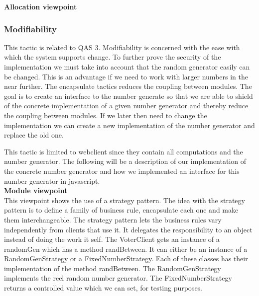 \noindent
\textbf{Allocation viewpoint}\\


\noindent
\subsubsection{Modifiability}
This tactic is related to QAS 3. Modifiability is concerned with the ease with which the system supports change. To further prove the security of the implementation we must take into account that the random generator easily can be changed. This is an advantage if we need to work with larger numbers in the near further. The encapsulate tactics reduces the coupling between modules. The goal is to create an interface to the number generate so that we are able to shield of the concrete implementation of a given number generator and thereby reduce the coupling between modules. If  we later then need to change the implementation we can create a new implementation of the number generator and  replace the old one. 


\begin{center}
\end{center}

\noindent
This tactic is limited to webclient since they contain all computations and the number generator. The following will be a description of our implementation of the concrete number generator and how we implemented an interface for this number generator in javascript.\\


\noindent
\textbf{Module viewpoint}\\
This viewpoint shows the use of a strategy pattern. The idea with the strategy pattern is to define a family of business rule, encapsulate each one and make them interchangeable. The strategy pattern lets the business rules vary independently from clients that use it. It delegates the responsibility to an object instead of doing the work it self. The VoterClient gets an instance of a randomGen which has a method randBetween. It can either be an instance of a RandomGenStrategy or a FixedNumberStrategy. Each of these classes has their implementation of the method randBetween. The RandomGenStrategy implements the reel random number generator. The FixedNumberStrategy returns a controlled value which we can set, for testing purposes.\\
\begin{center}
\end{center}






